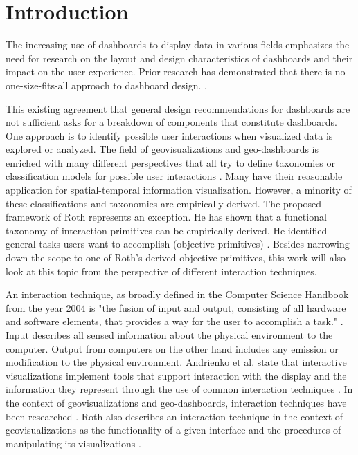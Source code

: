 \chapter{Introduction}
The increasing use of dashboards to display data in various fields emphasizes the need for research on the layout
and design characteristics of dashboards and their impact on the user experience. Prior research has demonstrated
that there is no one-size-fits-all approach to dashboard design. \citep*{Yigitbasioglu.2012,Sarikaya.2018}.

This existing agreement that general design recommendations for dashboards are not sufficient asks for a breakdown
of components that constitute dashboards. One approach is to identify possible user interactions when visualized
data is explored or analyzed. The field of geovisualizations and geo-dashboards is enriched with many different
perspectives that all try to define taxonomies or classification models for possible user interactions
\citep*{Andrienko.2003,Crampton.2002}. Many have their reasonable application for spatial-temporal information visualization.
However, a minority of these classifications and taxonomies are empirically derived. The proposed framework of Roth represents
an exception. He has shown that a functional taxonomy of interaction primitives can be empirically derived. He identified
general tasks users want to accomplish (objective primitives) \citep{Roth.2013}. Besides narrowing down the scope to one of
Roth's derived objective primitives, this work will also look at this topic from the perspective of different interaction
techniques.

An interaction technique, as broadly defined in the Computer Science Handbook from the year 2004 is "the fusion of input and
output, consisting of all hardware and software elements, that provides a way for the user to accomplish a task."
\citep*{Hinckley.2004}. Input describes all sensed information about the physical environment to the computer. Output from
computers on the other hand includes any emission or modification to the physical environment. Andrienko et al. state that
interactive visualizations implement tools that support interaction with the display and the information they represent through
the use of common interaction techniques \citep*{Andrienko.2020}. In the context of geovisualizations and geo-dashboards,
interaction techniques have been researched \citep*{Keim.2005,Lobo.2015,vanTonder.2011}.
Roth also describes an interaction technique in the context of geovisualizations as the functionality of a given interface and
the procedures of manipulating its visualizations \citep{Roth.2013}.


